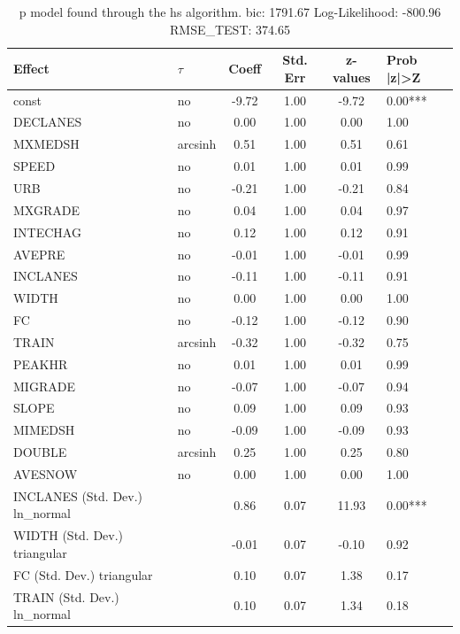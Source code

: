 \begin{table}
	\caption{p model found through the hs algorithm. bic: 1791.67 Log-Likelihood: -800.96 RMSE_TEST: 374.65}
	\begin{center}
		\begin{tabular}{|l|l|c|c|c|l|}
			\hline
			Effect & $\tau$ & Coeff & Std. Err & z-values & Prob |z|>Z \\
			\hline
			const & no & -9.72 & 1.00 & -9.72 & 0.00*** \\
			\hline
			DECLANES & no & 0.00 & 1.00 & 0.00 & 1.00 \\
			\hline
			MXMEDSH & arcsinh & 0.51 & 1.00 & 0.51 & 0.61 \\
			\hline
			SPEED & no & 0.01 & 1.00 & 0.01 & 0.99 \\
			\hline
			URB & no & -0.21 & 1.00 & -0.21 & 0.84 \\
			\hline
			MXGRADE & no & 0.04 & 1.00 & 0.04 & 0.97 \\
			\hline
			INTECHAG & no & 0.12 & 1.00 & 0.12 & 0.91 \\
			\hline
			AVEPRE & no & -0.01 & 1.00 & -0.01 & 0.99 \\
			\hline
			INCLANES & no & -0.11 & 1.00 & -0.11 & 0.91 \\
			\hline
			WIDTH & no & 0.00 & 1.00 & 0.00 & 1.00 \\
			\hline
			FC & no & -0.12 & 1.00 & -0.12 & 0.90 \\
			\hline
			TRAIN & arcsinh & -0.32 & 1.00 & -0.32 & 0.75 \\
			\hline
			PEAKHR & no & 0.01 & 1.00 & 0.01 & 0.99 \\
			\hline
			MIGRADE & no & -0.07 & 1.00 & -0.07 & 0.94 \\
			\hline
			SLOPE & no & 0.09 & 1.00 & 0.09 & 0.93 \\
			\hline
			MIMEDSH & no & -0.09 & 1.00 & -0.09 & 0.93 \\
			\hline
			DOUBLE & arcsinh & 0.25 & 1.00 & 0.25 & 0.80 \\
			\hline
			AVESNOW & no & 0.00 & 1.00 & 0.00 & 1.00 \\
			\hline
			INCLANES (Std. Dev.) ln_normal &  & 0.86 & 0.07 & 11.93 & 0.00*** \\
			\hline
			WIDTH (Std. Dev.) triangular &  & -0.01 & 0.07 & -0.10 & 0.92 \\
			\hline
			FC (Std. Dev.) triangular &  & 0.10 & 0.07 & 1.38 & 0.17 \\
			\hline
			TRAIN (Std. Dev.) ln_normal &  & 0.10 & 0.07 & 1.34 & 0.18 \\

\end{tabular}
\end{center}
\end{table}
